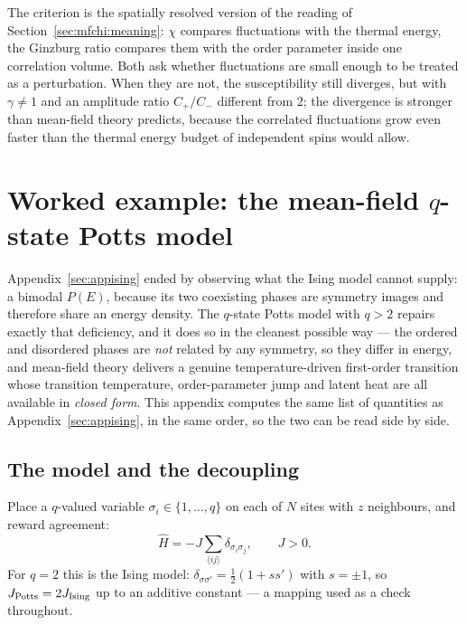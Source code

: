 \documentclass[10pt,a4paper]{article}
\theoremstyle{remark}
\begin{document}
The criterion is the spatially resolved version of the reading of
Section~\ref{sec:mfchi:meaning}: $\chi$ compares fluctuations with the thermal
energy, the Ginzburg ratio compares them with the order parameter inside one
correlation volume. Both ask whether fluctuations are small enough to be
treated as a perturbation. When they are not, the susceptibility still
diverges, but with $\gamma\neq1$ and an amplitude ratio $C_+/C_-$ different
from $2$; the divergence is stronger than mean-field theory predicts, because
the correlated fluctuations grow even faster than the thermal energy budget of
independent spins would allow.


\section{Worked example: the mean-field \texorpdfstring{$q$}{q}-state Potts model}
\label{sec:apppotts}

Appendix~\ref{sec:appising} ended by observing what the Ising model cannot supply:
a bimodal $P(E)$, because its two coexisting phases are symmetry images and
therefore share an energy density. The $q$-state Potts model with $q>2$ repairs
exactly that deficiency, and it does so in the cleanest possible way --- the
ordered and disordered phases are \emph{not} related by any symmetry, so they
differ in energy, and mean-field theory delivers a genuine temperature-driven
first-order transition whose transition temperature, order-parameter jump and
latent heat are all available in \emph{closed form}. This appendix computes the
same list of quantities as Appendix~\ref{sec:appising}, in the same order, so the
two can be read side by side.

\subsection{The model and the decoupling}
\label{sec:apppotts:model}

Place a $q$-valued variable $\sigma_i\in\{1,\dots,q\}$ on each of $N$ sites with
$z$ neighbours, and reward agreement:
\[
\hat H=-J\sum_{\langle ij\rangle}\delta_{\sigma_i\sigma_j} ,\qquad J>0 .
\]
For $q=2$ this is the Ising model: $\delta_{\sigma\sigma'}=\tfrac12(1+ss')$ with
$s=\pm1$, so $J_{\rm Potts}=2J_{\rm Ising}$ up to an additive constant --- a
mapping used as a check throughout.
\end{document}
